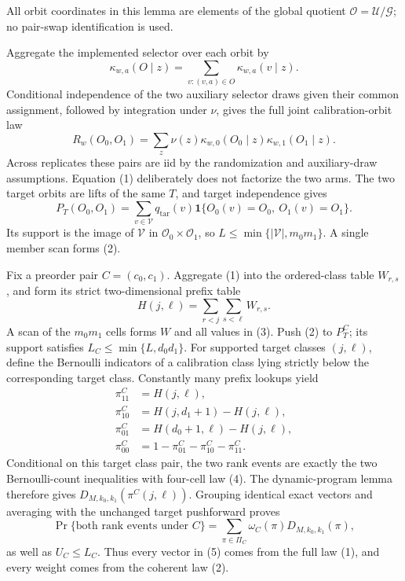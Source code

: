 All orbit coordinates in this lemma are elements of the global quotient \(\mathcal O=\mathcal U/\mathcal G\); no pair-swap identification is used.

Aggregate the implemented selector over each orbit by
\[
\kappa_{w,a}(O\mid z)=\sum_{v:(v,a)\in O}\kappa_{w,a}(v\mid z).
\]
Conditional independence of the two auxiliary selector draws given their common assignment, followed by integration under \(\nu\), gives the full joint calibration-orbit law
\[
R_w(O_0,O_1)=\sum_z\nu(z)\kappa_{w,0}(O_0\mid z)\kappa_{w,1}(O_1\mid z).
\tag{1}
\]
Across replicates these pairs are iid by the randomization and auxiliary-draw assumptions. Equation (1) deliberately does not factorize the two arms. The two target orbits are lifts of the same \(T\), and target independence gives
\[
P_T(O_0,O_1)=\sum_{v\in\mathcal V}q_{\mathrm{tar}}(v)\mathbf 1\{O_0(v)=O_0,\ O_1(v)=O_1\}.
\tag{2}
\]
Its support is the image of \(\mathcal V\) in \(\mathcal O_0\times\mathcal O_1\), so \(L\le\min\{|\mathcal V|,m_0m_1\}\). A single member scan forms (2).

Fix a preorder pair \(C=(c_0,c_1)\). Aggregate (1) into the ordered-class table \(W_{r,s}\), and form its strict two-dimensional prefix table
\[
H(j,\ell)=\sum_{r<j}\sum_{s<\ell}W_{r,s}.
\tag{3}
\]
A scan of the \(m_0m_1\) cells forms \(W\) and all values in (3). Push (2) to \(P_T^C\); its support satisfies \(L_C\le\min\{L,d_0d_1\}\). For supported target classes \((j,\ell)\), define the Bernoulli indicators of a calibration class lying strictly below the corresponding target class. Constantly many prefix lookups yield
\[
\begin{aligned}
\pi^C_{11}&=H(j,\ell),\\
\pi^C_{10}&=H(j,d_1+1)-H(j,\ell),\\
\pi^C_{01}&=H(d_0+1,\ell)-H(j,\ell),\\
\pi^C_{00}&=1-\pi^C_{01}-\pi^C_{10}-\pi^C_{11}.
\end{aligned}
\tag{4}
\]
Conditional on this target class pair, the two rank events are exactly the two Bernoulli-count inequalities with four-cell law (4). The dynamic-program lemma therefore gives \(D_{M,k_0,k_1}(\pi^C(j,\ell))\). Grouping identical exact vectors and averaging with the unchanged target pushforward proves
\[
\Pr\{\text{both rank events under }C\}=\sum_{\pi\in\Pi_C}\omega_C(\pi)D_{M,k_0,k_1}(\pi),
\tag{5}
\]
as well as \(U_C\le L_C\). Thus every vector in (5) comes from the full law (1), and every weight comes from the coherent law (2).

